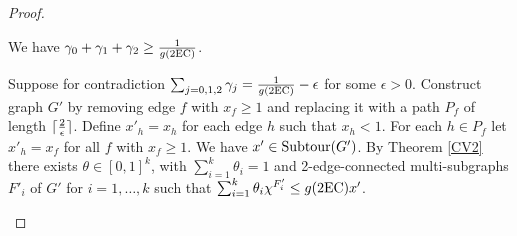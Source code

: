 \begin{proof}
	\begin{claim}\label{CVexists}
		We have $\gamma_0 + \gamma_1+\gamma_2\geq \frac{1}{g(\2ec)}$.
	\end{claim}
	\begin{cproof}
		Suppose for contradiction $\sum_{j=0,1,2}\gamma_j = \frac{1}{g(\2ec)} - \epsilon$ for some $\epsilon >0$. Construct graph $G'$ by removing edge $f$ with $x_f\geq 1$ and replacing it with a path $P_f$ of length $\lceil\frac{2}{\epsilon}\rceil$. Define $x'_h = x_h$ for each edge $h$ such that $x_h<1$. For each $h\in P_f$ let $x'_h= x_f$ for all $f$ with $x_f\geq 1$. We have $x'\in \operatorname{{Subtour}}(G')$. By Theorem \ref{CV2} there exists $\theta \in [0,1]^k$, with $\sum_{i=1}^{k}\theta_i = 1$ and 2-edge-connected multi-subgraphs $F'_i$ of $G'$ for $i=1,\ldots,k$ such that 
		$\sum_{i=1}^{k}\theta_i \chi^{F'_i}\leq g(\2ec)x'$. 
		

\end{cproof}
\end{proof}
